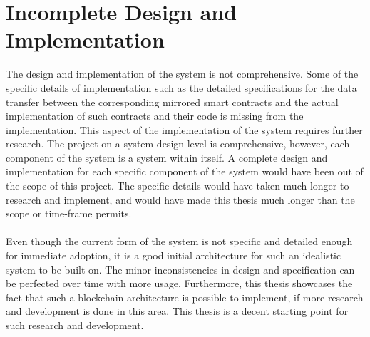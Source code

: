 \documentclass[a4paper,twoside,phd]{BYUPhys}
\begin{document}
\section{Incomplete Design and Implementation}
The design and implementation of the system is not comprehensive. Some of the specific details of implementation such as the detailed specifications for the data transfer between the corresponding mirrored smart contracts and the actual implementation of such contracts and their code is missing from the implementation. This aspect of the implementation of the system requires further research. The project on a system design level is comprehensive, however, each component of the system is a system within itself. A complete design and implementation for each specific component of the system would have been out of the scope of this project. The specific details would have taken much longer to research and implement, and would have made this thesis much longer than the scope or time-frame permits.
\\
\\
Even though the current form of the system is not specific and detailed enough for immediate adoption, it is a good initial architecture for such an idealistic system to be built on. The minor inconsistencies in design and specification can be perfected over time with more usage. Furthermore, this thesis showcases the fact that such a blockchain architecture is possible to implement, if more research and development is done in this area. This thesis is a decent starting point for such research and development.
\end{document}
